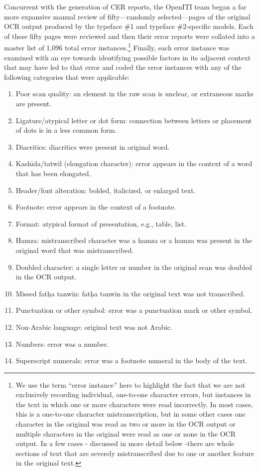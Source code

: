 Concurrent with the generation of CER reports, the OpenITI team began a far
more expansive manual review of fifty—randomly selected—pages of the original
OCR output produced by the typeface \#1 and typeface \#2-specific models. Each of
these fifty pages were reviewed and then their error reports were collated into
a master list of 1,096 total error instances.\footnote{We use the term “error
instance” here to highlight the fact that we are not exclusively recording
individual, one-to-one character errors, but instances in the text in which one
or more characters were read incorrectly. In most cases, this is a one-to-one
character mistranscription, but in some other cases one character in the
original was read as two or more in the OCR output or multiple characters in
the original were read as one or none in the OCR output. In a few cases -
discussed in more detail below -there are whole sections of text that are
severely mistranscribed due to one or another feature in the original text.}
Finally, each error instance was examined with an eye towards identifying
possible factors in its adjacent context that may have led to that error and
coded the error instances with any of the following categories that were
applicable:

\begin{enumerate}
	\item Poor scan quality: an element in the raw scan is unclear, or extraneous marks are present.
	\item Ligature/atypical letter or dot form: connection between letters or placement of dots is in a less common form.
	\item Diacritics: diacritics were present in original word.
	\item Kashīda/tatwīl (elongation character): error appears in the context of a word that has been elongated. 
	\item Header/font alteration: bolded, italicized, or enlarged text.
	\item Footnote: error appears in the context of a footnote.
	\item Format: atypical format of presentation, e.g., table, list.
	\item Hamza: mistranscribed character was a hamza or a hamza was present in the original word that was mistranscribed.
	\item Doubled character: a single letter or number in the original scan was doubled in the OCR output.
	\item Missed fatḥa tanwīn: fatḥa tanwīn in the original text was not transcribed.
	\item Punctuation or other symbol: error was a punctuation mark or other symbol.
	\item Non-Arabic language: original text was not Arabic.
	\item Numbers: error was a number.
	\item Superscript numerals: error was a footnote numeral in the body of the text.
\end{enumerate}

